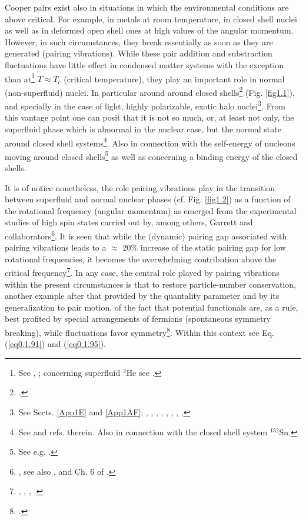  Cooper pairs exist also in situations in which the environmental conditions are above critical. For example, in metals at room temperature, in closed shell nuclei as well as in deformed open shell ones at high values of the angular momentum. However, in such circumstances, they break essentially as soon as they are generated (pairing vibrations). While these pair addition and substraction fluctuations have little effect in condensed matter systems with the exception than at\footnote{See \cite{Schmidt:68}, \cite{Schmid:69} \cite{Abrahams:68}; concerning superfluid $^3$He see \cite{Wolfe:78}.} $T\approx T_c$ (critical temperature), they play an important role in normal (non-superfluid) nuclei. In particular around around closed shells\footnote{\cite{Shimizu:90}.} (Fig. \ref{fig1.1}), and specially in the case of light, highly polarizable, exotic halo nuclei\footnote{See Sects. \ref{App1E} and \ref{App1AF}; \cite{Bohr:75} , \cite{Bes:66}, \cite{Hogassen:61}, \cite{Schmidt:72}, \cite{Schmidt:68}, \cite{Barranco:01}, \cite{Potel:13}, \cite{Potel:14}.}. From this vantage point one can posit that it is not so much, or, at least not only, the superfluid phase which is abnormal in the nuclear case, but the normal state around closed shell systems\footnote{See \cite{Potel:13} and refs. therein. Also \cite{Potel:13b} in connection with the closed shell system $^{132}$Sn.}. Also in connection with the self-energy of nucleons moving around closed shells\footnote{See e.g. \cite{Bes:71,Flynn:71}.} as well as concerning a binding energy of the closed shells.
 
 
  It is of notice nonetheless, the role pairing vibrations play in the  transition between superfluid and normal nuclear phases (cf. Fig. \ref{fig1.2}) as a function of the rotational frequency (angular momentum) as emerged from the experimental studies of high spin states carried out by, among others, Garrett and collaborators\footnote{\cite{Garrett:85,Garrett:86}, see also \cite{Shimizu:89}, \cite{Barranco:87b} and Ch. 6 of \cite{Brink:05}.}.
 It is seen that while the (dynamic) pairing gap associated with pairing vibrations leads to a $\approx$ 20\% increase of the static pairing gap for low rotational frequencies, it becomes the overwhelming contribution above the critical frequency\footnote{\cite{Shimizu:89}, \cite{Shimizu:90}, \cite{Shimizu:13},  \cite{Donau:99} \cite{Shimizu:00}.}. In any case, the central role played by pairing vibrations within the present circumstances is that to restore particle-number conservation, another example after that provided by the quantality parameter and by its generalization to pair motion, of the fact that potential functionals are, as a rule, best profited by special arrangements of fermions (spontaneous symmetry breaking), while fluctuations favor symmetry\footnote{\cite{Anderson:84,Anderson:76}.}. Within this context see Eq. (\ref{eq0.1.91}) and (\ref{eq0.1.95}).
  
